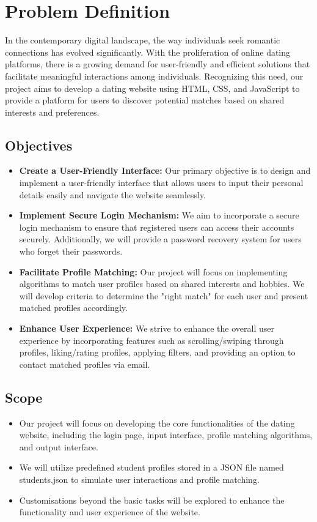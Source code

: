 \chapter{Problem Definition}

In the contemporary digital landscape, the way individuals seek romantic connections has evolved significantly. With the proliferation of online dating platforms, there is a growing demand for user-friendly and efficient solutions that facilitate meaningful interactions among individuals. Recognizing this need, our project aims to develop a dating website using HTML, CSS, and JavaScript to provide a platform for users to discover potential matches based on shared interests and preferences.
\section{Objectives}
\begin{itemize}
    \item \textbf{Create a User-Friendly Interface:} Our primary objective is to design and implement a user-friendly interface that allows users to input their personal details easily and navigate the website seamlessly.
    \item \textbf{Implement Secure Login Mechanism:} We aim to incorporate a secure login mechanism to ensure that registered users can access their accounts securely. Additionally, we will provide a password recovery system for users who forget their passwords.
    \item \textbf{Facilitate Profile Matching:} Our project will focus on implementing algorithms to match user profiles based on shared interests and hobbies. We will develop criteria to determine the "right match" for each user and present matched profiles accordingly.
    \item \textbf{Enhance User Experience:} We strive to enhance the overall user experience by incorporating features such as scrolling/swiping through profiles, liking/rating profiles, applying filters, and providing an option to contact matched profiles via email.
\end{itemize}

\section{Scope}
\begin{itemize}
    \item Our project will focus on developing the core functionalities of the dating website, including the login page, input interface, profile matching algorithms, and output interface.
    \item We will utilize predefined student profiles stored in a JSON file named students.json to simulate user interactions and profile matching.
    \item Customisations beyond the basic tasks will be explored to enhance the functionality and user experience of the website.
\end{itemize}





